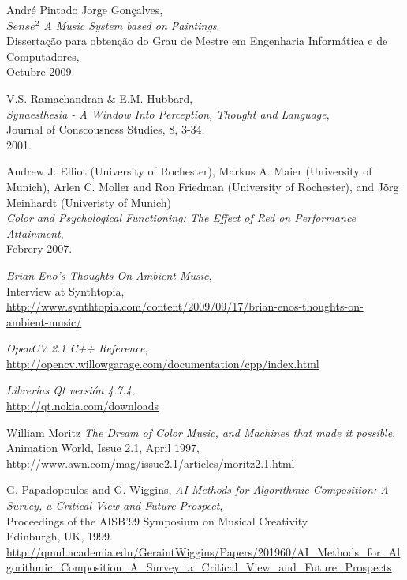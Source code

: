 \begin{thebibliography}{9}
  André Pintado Jorge Gonçalves,\\
  \emph{$Sense^{2}$ A Music System based on Paintings}.\\
  Dissertação para obtenção do Grau de Mestre em Engenharia Informática e de Computadores,\\
  Octubre 2009.

  V.S. Ramachandran \& E.M. Hubbard,\\
  \emph{Synaesthesia - A Window Into Perception, Thought and Language},\\
  Journal of Conscousness Studies, 8, 3-34,\\
  2001.

  Andrew J. Elliot (University of Rochester), Markus A. Maier (University of Munich), Arlen C. Moller and Ron Friedman (University of Rochester), and Jörg Meinhardt (Univeristy of Munich)\\
  \emph{Color and Psychological Functioning: The Effect of Red on Performance Attainment},\\
  Febrery 2007.  

  \emph{Brian Eno's Thoughts On Ambient Music},\\
  Interview at Synthtopia,\\
  \url{http://www.synthtopia.com/content/2009/09/17/brian-enos-thoughts-on-ambient-music/}

  \emph{OpenCV 2.1 C++ Reference},\\
  \url{http://opencv.willowgarage.com/documentation/cpp/index.html}

  \emph{Librerías Qt versión 4.7.4},\\
  \url{http://qt.nokia.com/downloads}

 William Moritz
 \emph{The Dream of Color Music, and Machines that made it possible},\\
 Animation World, Issue 2.1, April 1997,\\ 
 \url{http://www.awn.com/mag/issue2.1/articles/moritz2.1.html}

 G. Papadopoulos and G. Wiggins,
 \emph{AI Methods for Algorithmic Composition: A Survey, a Critical View  and Future Prospect},\\
 Proceedings of the AISB’99 Symposium on Musical Creativity\\
 Edinburgh, UK, 1999.\\
 \url{http://qmul.academia.edu/GeraintWiggins/Papers/201960/AI_Methods_for_Algorithmic_Composition_A_Survey_a_Critical_View_and_Future_Prospects}


\end{thebibliography}
